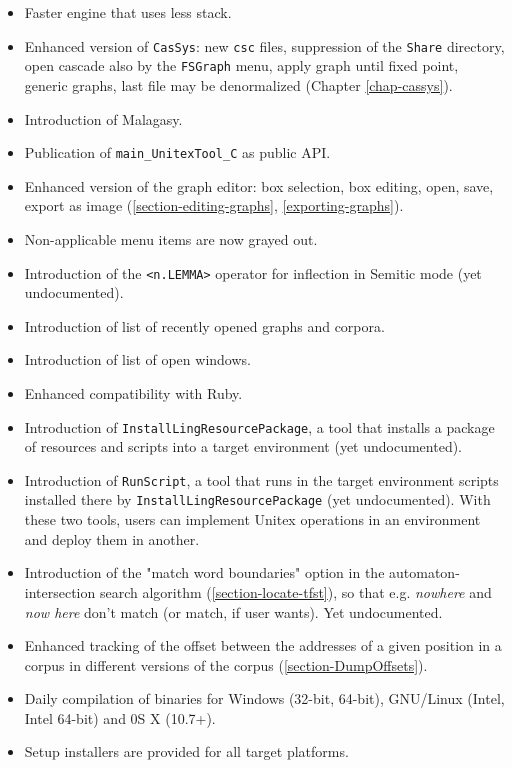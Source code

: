 \begin{itemize}

  \item Faster engine that uses less stack.
  \item Enhanced version of \verb$CasSys$: new \verb$csc$ files, suppression of the \verb$Share$ directory, open cascade also by the \verb$FSGraph$ menu, apply graph until fixed point, generic graphs, last file may be denormalized
  (Chapter \ref{chap-cassys}).
  \item Introduction of Malagasy.
  \item Publication of \verb$main_UnitexTool_C$ as public API.
  \item Enhanced version of the graph editor: box selection, box editing, open, save, export as image (\ref{section-editing-graphs}, \ref{exporting-graphs}).
  \item Non-applicable menu items are now grayed out.
  \item Introduction of the \verb$<n.LEMMA>$ operator for inflection in Semitic mode (yet undocumented).
  \item Introduction of list of recently opened graphs and corpora.
  \item Introduction of list of open windows.
  \item Enhanced compatibility with Ruby.
  \item Introduction of \verb$InstallLingResourcePackage$, a tool that installs a package of resources and scripts into a target environment (yet undocumented).
  \item Introduction of \verb$RunScript$, a tool that runs in the target environment scripts installed there by \verb$InstallLingResourcePackage$ (yet undocumented). With these two tools, users can implement Unitex operations in an environment and deploy them in another.
  \item Introduction of the "match word boundaries" option in the automaton-intersection search algorithm (\ref{section-locate-tfst}), so that e.g. \textit{nowhere} and \textit{now here} don't match (or match, if user wants). Yet undocumented.
  \item Enhanced tracking of the offset between the addresses of a given position in a corpus in different versions of the corpus (\ref{section-DumpOffsets}).
  \item Daily compilation of binaries for Windows (32-bit, 64-bit), GNU/Linux (Intel, Intel 64-bit) and 0S X (10.7+).
  \item Setup installers are provided for all target platforms.
  
\end{itemize}

